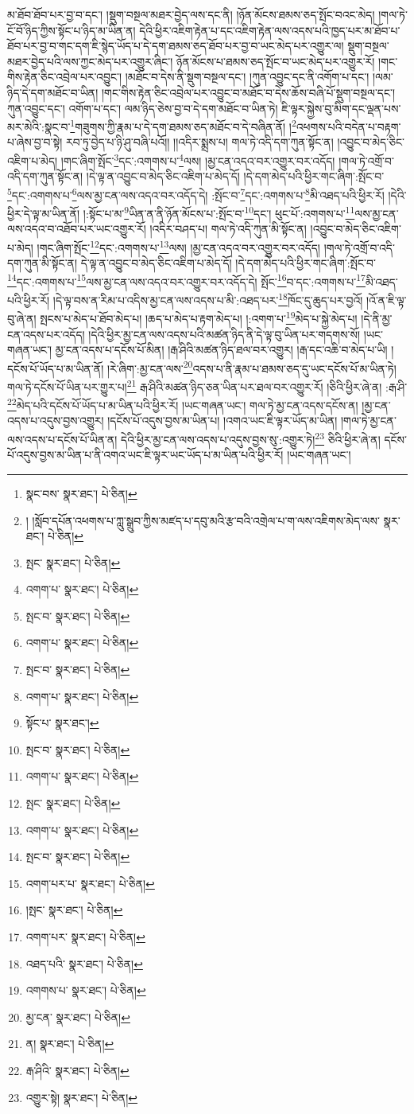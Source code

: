 མ་ཐོབ་ཐོབ་པར་བྱ་བ་དང་། །སྡུག་བསྔལ་མཐར་བྱེད་ལས་དང་ནི། །ཉོན་མོངས་ཐམས་ཅད་སྤོང་བའང་མེད། །གལ་ཏེ་ངོ་བོ་ཉིད་ཀྱིས་སྟོང་པ་ཉིད་མ་ཡིན་ན། དེའི་ཕྱིར་འཇིག་རྟེན་པ་དང་འཇིག་རྟེན་ལས་འདས་པའི་ཁྱད་པར་མ་ཐོབ་པ་ཐོབ་པར་བྱ་བ་གང་དག་ཇི་སྙེད་ཡོད་པ་དེ་དག་ཐམས་ཅད་ཐོབ་པར་བྱ་བ་ཡང་མེད་པར་འགྱུར་ལ། སྡུག་བསྔལ་མཐར་བྱེད་པའི་ལས་ཀྱང་མེད་པར་འགྱུར་ཞིང་། ཉོན་མོངས་པ་ཐམས་ཅད་སྤོང་བ་ཡང་མེད་པར་འགྱུར་རོ། །གང་གིས་རྟེན་ཅིང་འབྲེལ་པར་འབྱུང་། །མཐོང་བ་དེས་ནི་སྡུག་བསྔལ་དང་། །ཀུན་འབྱུང་དང་ནི་འགོག་པ་དང་། །ལམ་ཉིད་དེ་དག་མཐོང་བ་ཡིན། །གང་གིས་རྟེན་ཅིང་འབྲེལ་པར་འབྱུང་བ་མཐོང་བ་དེས་ཆོས་བཞི་པོ་སྡུག་བསྔལ་དང་། ཀུན་འབྱུང་དང་། འགོག་པ་དང་། ལམ་ཉིད་ཅེས་བྱ་བ་དེ་དག་མཐོང་བ་ཡིན་ཏེ། ཇི་ལྟར་སྐྱེས་བུ་མིག་དང་ལྡན་པས་མར་མེའི་:སྣང་བ་\footnote{སྣང་བས་  སྣར་ཐང་།  པེ་ཅིན། }གཟུགས་ཀྱི་རྣམ་པ་དེ་དག་ཐམས་ཅད་མཐོང་བ་དེ་བཞིན་ནོ། །\footnote{། །སློབ་དཔོན་འཕགས་པ་ཀླུ་སྒྲུབ་ཀྱིས་མཛད་པ་དབུ་མའི་རྩ་བའི་འགྲེལ་པ་ག་ལས་འཇིགས་མེད་ལས་  སྣར་ཐང་།  པེ་ཅིན། }འཕགས་པའི་བདེན་པ་བརྟག་པ་ཞེས་བྱ་བ་སྟེ། རབ་ཏུ་བྱེད་པ་ཉི་ཤུ་བཞི་པའོ།། །།འདིར་སྨྲས་པ། གལ་ཏེ་འདི་དག་ཀུན་སྟོང་ན། །འབྱུང་བ་མེད་ཅིང་འཇིག་པ་མེད། །གང་ཞིག་སྤོང་\footnote{སྤང་  སྣར་ཐང་།  པེ་ཅིན། }དང་:འགགས་པ་\footnote{འགག་པ་  སྣར་ཐང་།  པེ་ཅིན། }ལས། །མྱ་ངན་འདའ་བར་འགྱུར་བར་འདོད། །གལ་ཏེ་འགྲོ་བ་འདི་དག་ཀུན་སྟོང་ན། །དེ་ལྟ་ན་འབྱུང་བ་མེད་ཅིང་འཇིག་པ་མེད་དོ། །དེ་དག་མེད་པའི་ཕྱིར་གང་ཞིག་:སྤོང་བ་\footnote{སྤང་བ་  སྣར་ཐང་།  པེ་ཅིན། }དང་:འགགས་པ་\footnote{འགག་པ་  སྣར་ཐང་།  པེ་ཅིན། }ལས་མྱ་ངན་ལས་འདའ་བར་འདོད་དེ། :སྤོང་བ་\footnote{སྤང་བ་  སྣར་ཐང་།  པེ་ཅིན། }དང་:འགགས་པ་\footnote{འགག་པ་  སྣར་ཐང་།  པེ་ཅིན། }མི་འཐད་པའི་ཕྱིར་རོ། །དེའི་ཕྱིར་དེ་ལྟ་མ་ཡིན་ནོ། །:སྟོང་པ་མ་\footnote{སྟོང་པ་  སྣར་ཐང་། }ཡིན་ན་ནི་ཉོན་མོངས་པ་:སྤོང་བ་\footnote{སྤང་བ་  སྣར་ཐང་།  པེ་ཅིན། }དང་། ཕུང་པོ་:འགགས་པ་\footnote{འགག་པ་  སྣར་ཐང་།  པེ་ཅིན། }ལས་མྱ་ངན་ལས་འདའ་བ་འཐོབ་པར་ཡང་འགྱུར་རོ། །འདིར་བཤད་པ། གལ་ཏེ་འདི་ཀུན་མི་སྟོང་ན། །འབྱུང་བ་མེད་ཅིང་འཇིག་པ་མེད། །གང་ཞིག་སྤོང་\footnote{སྤང་  སྣར་ཐང་།  པེ་ཅིན། }དང་:འགགས་པ་\footnote{འགག་པ་  སྣར་ཐང་།  པེ་ཅིན། }ལས། །མྱ་ངན་འདའ་བར་འགྱུར་བར་འདོད། །གལ་ཏེ་འགྲོ་བ་འདི་དག་ཀུན་མི་སྟོང་ན། དེ་ལྟ་ན་འབྱུང་བ་མེད་ཅིང་འཇིག་པ་མེད་དོ། །དེ་དག་མེད་པའི་ཕྱིར་གང་ཞིག་:སྤོང་བ་\footnote{སྤང་བ་  སྣར་ཐང་།  པེ་ཅིན། }དང་:འགགས་པ་\footnote{འགག་པར་པ་  སྣར་ཐང་།  པེ་ཅིན། }ལས་མྱ་ངན་ལས་འདའ་བར་འགྱུར་བར་འདོད་དེ། སྤོང་\footnote{།སྤང་  སྣར་ཐང་།  པེ་ཅིན། }བ་དང་:འགགས་པ་\footnote{འགག་པར་  སྣར་ཐང་།  པེ་ཅིན། }མི་འཐད་པའི་ཕྱིར་རོ། །དེ་ལྟ་བས་ན་རིམ་པ་འདིས་མྱ་ངན་ལས་འདས་པ་མི་:འཐད་པར་\footnote{འཐད་པའི་  སྣར་ཐང་།  པེ་ཅིན། }ཁོང་དུ་ཆུད་པར་བྱའོ། །འོ་ན་ཇི་ལྟ་བུ་ཞེ་ན། སྤངས་པ་མེད་པ་ཐོབ་མེད་པ། །ཆད་པ་མེད་པ་རྟག་མེད་པ། །:འགག་པ་\footnote{འགགས་པ་  སྣར་ཐང་།  པེ་ཅིན། }མེད་པ་སྐྱེ་མེད་པ། །དེ་ནི་མྱ་ངན་འདས་པར་འདོད། །དེའི་ཕྱིར་མྱ་ངན་ལས་འདས་པའི་མཚན་ཉིད་ནི་དེ་ལྟ་བུ་ཡིན་པར་གདགས་སོ། །ཡང་གཞན་ཡང་། མྱ་ངན་འདས་པ་དངོས་པོ་མིན། །རྒ་ཤིའི་མཚན་ཉིད་ཐལ་བར་འགྱུར། །རྒ་དང་འཆི་བ་མེད་པ་ཡི། །དངོས་པོ་ཡོད་པ་མ་ཡིན་ནོ། །རེ་ཞིག་:མྱ་ངན་ལས་\footnote{མྱ་ངན་  སྣར་ཐང་།  པེ་ཅིན། }འདས་པ་ནི་རྣམ་པ་ཐམས་ཅད་དུ་ཡང་དངོས་པོ་མ་ཡིན་ཏེ། གལ་ཏེ་དངོས་པོ་ཡིན་པར་གྱུར་པ།\footnote{ན།  སྣར་ཐང་།  པེ་ཅིན། } རྒ་ཤིའི་མཚན་ཉིད་ཅན་ཡིན་པར་ཐལ་བར་འགྱུར་རོ། །ཅིའི་ཕྱིར་ཞེ་ན། :རྒ་ཤི་\footnote{རྒ་ཤིའི་  སྣར་ཐང་།  པེ་ཅིན། }མེད་པའི་དངོས་པོ་ཡོད་པ་མ་ཡིན་པའི་ཕྱིར་རོ། །ཡང་གཞན་ཡང་། གལ་ཏེ་མྱ་ངན་འདས་དངོས་ན། །མྱ་ངན་འདས་པ་འདུས་བྱས་འགྱུར། །དངོས་པོ་འདུས་བྱས་མ་ཡིན་པ། །འགའ་ཡང་ཇི་ལྟར་ཡོད་མ་ཡིན། །གལ་ཏེ་མྱ་ངན་ལས་འདས་པ་དངོས་པོ་ཡིན་ན། དེའི་ཕྱིར་མྱ་ངན་ལས་འདས་པ་འདུས་བྱས་སུ་:འགྱུར་ཏེ།\footnote{འགྱུར་སྟེ།  སྣར་ཐང་།  པེ་ཅིན། } ཅིའི་ཕྱིར་ཞེ་ན། དངོས་པོ་འདུས་བྱས་མ་ཡིན་པ་ནི་འགའ་ཡང་ཇི་ལྟར་ཡང་ཡོད་པ་མ་ཡིན་པའི་ཕྱིར་རོ། །ཡང་གཞན་ཡང་། 